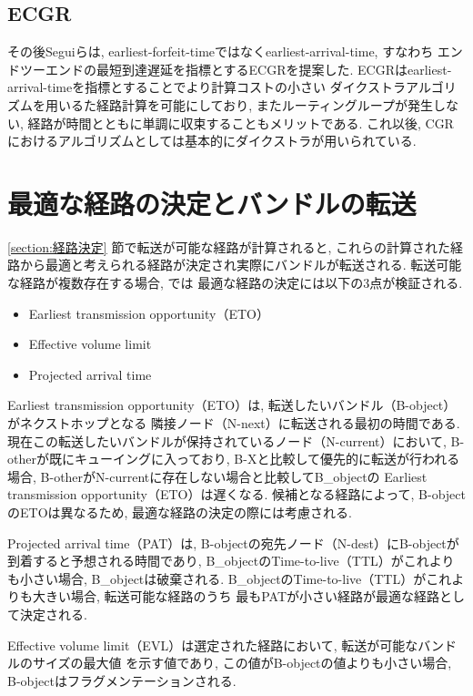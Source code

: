 \subsection{ECGR}
その後Seguiらは, earliest-forfeit-timeではなくearliest-arrival-time, すなわち
エンドツーエンドの最短到達遅延を指標とするECGRを提案した\cite{6134460}.  
ECGRはearliest-arrival-timeを指標とすることでより計算コストの小さい
ダイクストラアルゴリズムを用いるた経路計算を可能にしており, 
またルーティングループが発生しない, 経路が時間とともに単調に収束することもメリットである.  
これ以後, CGRにおけるアルゴリズムとしては基本的にダイクストラが用いられている.  

\section{最適な経路の決定とバンドルの転送}
\label{section:バンドルの転送}

\ref{section:経路決定} 節で転送が可能な経路が計算されると, 
これらの計算された経路から最適と考えられる経路が決定され実際にバンドルが転送される.  
転送可能な経路が複数存在する場合, \cite{schedule_aware_bundle_routing}では
最適な経路の決定には以下の3点が検証される.  

\begin{itemize}
    \item Earliest transmission opportunity（ETO）
    \item Effective volume limit
    \item Projected arrival time
\end{itemize}

Earliest transmission opportunity（ETO）は, 転送したいバンドル（B-object）がネクストホップとなる
隣接ノード（N-next）に転送される最初の時間である.  
現在この転送したいバンドルが保持されているノード（N-current）において, 
B-otherが既にキューイングに入っており, B-Xと比較して優先的に転送が行われる場合, 
B-otherがN-currentに存在しない場合と比較してB_objectの
Earliest transmission opportunity（ETO）は遅くなる.  
候補となる経路によって, B-objectのETOは異なるため, 最適な経路の決定の際には考慮される.  

Projected arrival time（PAT）は, B-objectの宛先ノード（N-dest）にB-objectが到着すると予想される時間であり, 
B_objectのTime-to-live（TTL）がこれよりも小さい場合, B_objectは破棄される.  
B_objectのTime-to-live（TTL）がこれよりも大きい場合, 転送可能な経路のうち
最もPATが小さい経路が最適な経路として決定される.  

Effective volume limit（EVL）は選定された経路において, 転送が可能なバンドルのサイズの最大値
を示す値であり, この値がB-objectの値よりも小さい場合, B-objectはフラグメンテーションされる.  



